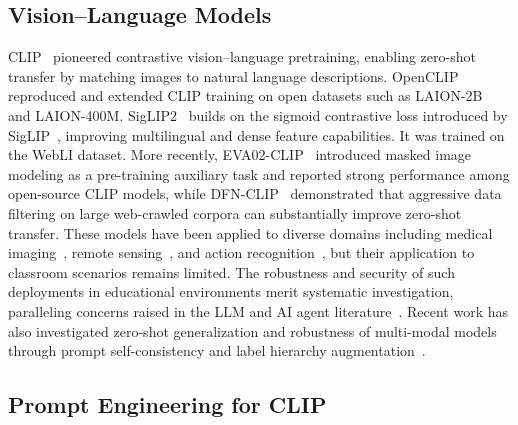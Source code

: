 \documentclass[symmetry,article,submit,pdftex,moreauthors]{Definitions/mdpi}
\begin{document}
\subsection{Vision--Language Models}

CLIP~\cite{radford2021learning} pioneered contrastive vision--language pretraining, enabling zero-shot transfer by matching images to natural language descriptions.
OpenCLIP~\cite{cherti2023reproducible} reproduced and extended CLIP training on open datasets such as LAION-2B~\cite{schuhmann2022laion5b} and LAION-400M.
SigLIP2~\cite{tschannen2025siglip2} builds on the sigmoid contrastive loss introduced by SigLIP~\cite{zhai2023sigmoid}, improving multilingual and dense feature capabilities. It was trained on the WebLI dataset.
More recently, EVA02-CLIP~\cite{sun2023eva02} introduced masked image modeling as a pre-training auxiliary task and reported strong performance among open-source CLIP models, while DFN-CLIP~\cite{fang2023data} demonstrated that aggressive data filtering on large web-crawled corpora can substantially improve zero-shot transfer.
These models have been applied to diverse domains including medical imaging~\cite{wang2022medclip}, remote sensing~\cite{liu2024remoteclip}, and action recognition~\cite{wang2021actionclip}, but their application to classroom scenarios remains limited. The robustness and security of such deployments in educational environments merit systematic investigation, paralleling concerns raised in the LLM and AI agent literature~\cite{zhou2025security_llm,deng2025ai_agents}. Recent work has also investigated zero-shot generalization and robustness of multi-modal models through prompt self-consistency and label hierarchy augmentation~\cite{ge2023improving}.

\subsection{Prompt Engineering for CLIP}
\end{document}
